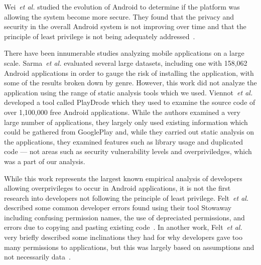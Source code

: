 \documentclass[conference]{IEEEtran}
\begin{document}
Wei~\emph{et al.} studied the evolution of Android to determine if the platform was allowing the system become more secure. They found that the privacy and security in the overall Android system is not improving over time and that the principle of least privilege is not being adequately addressed~\cite{Wei:2012:PEA:2420950.2420956}.

There have been innumerable studies analyzing mobile applications on a large scale. Sarma~\emph{et al.} evaluated several large datasets, including one with 158,062 Android applications in order to gauge the risk of installing the application, with some of the results broken down by genre. However, this work did not analyze the application using the range of static analysis tools which we used. Viennot~\emph{et al.} developed a tool called PlayDrode which they used to examine the source code of over 1,100,000 free Android applications. While the authors examined a very large number of applications, they largely only used existing information which could be gathered from GooglePlay and, while they carried out static analysis on the applications, they examined features such as library usage and duplicated code --- not areas such as security vulnerability levels and overpriviledges, which was a part of our analysis.


While this work represents the largest known empirical analysis of developers allowing overprivileges to occur in Android applications, it is not the first research into developers not following the principle of least privilege. Felt~\emph{et al.} described some common developer errors found using their tool Stowaway including confusing permission names, the use of depreciated permissions, and errors due to copying and pasting existing code~\cite{Felt:2011:APD:2046707.2046779}. In another work, Felt~\emph{et al.} very briefly described some inclinations they had for why developers gave too many permissions to applications, but this was largely based on assumptions and not necessarily data~\cite{Felt:2011:EAP:2002168.2002175}.


\end{document}
